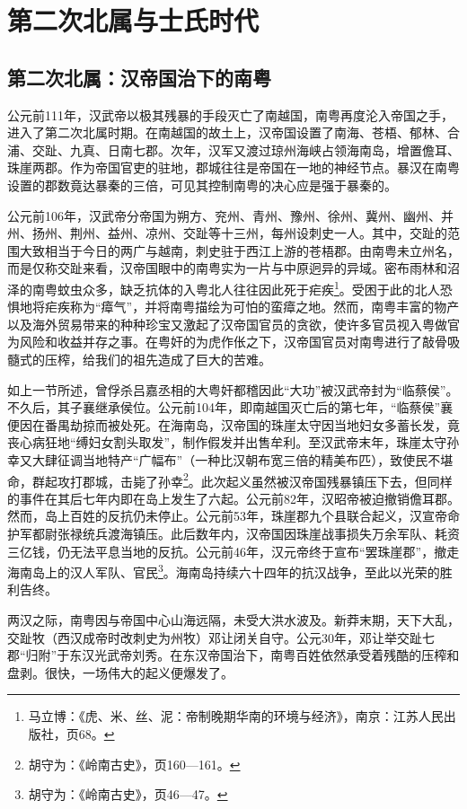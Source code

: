 \chapter{第二次北属与士氏时代}

\section{第二次北属：汉帝国治下的南粤}

\indent 公元前111年，汉武帝以极其残暴的手段灭亡了南越国，南粤再度沦入帝国之手，进入了第二次北属时期。在南越国的故土上，汉帝国设置了南海、苍梧、郁林、合浦、交趾、九真、日南七郡。次年，汉军又渡过琼州海峡占领海南岛，增置儋耳、珠崖两郡。作为帝国官吏的驻地，郡城往往是帝国在一地的神经节点。暴汉在南粤设置的郡数竟达暴秦的三倍，可见其控制南粤的决心应是强于暴秦的。

公元前106年，汉武帝分帝国为朔方、兖州、青州、豫州、徐州、冀州、幽州、并州、扬州、荆州、益州、凉州、交趾等十三州，每州设刺史一人。其中，交趾的范围大致相当于今日的两广与越南，刺史驻于西江上游的苍梧郡。由南粤未立州名，而是仅称交趾来看，汉帝国眼中的南粤实为一片与中原迥异的异域。密布雨林和沼泽的南粤蚊虫众多，缺乏抗体的入粤北人往往因此死于疟疾\footnote{马立博：《虎、米、丝、泥：帝制晚期华南的环境与经济》，南京：江苏人民出版社，页68。}。受困于此的北人恐惧地将疟疾称为“瘴气”，并将南粤描绘为可怕的蛮瘴之地。然而，南粤丰富的物产以及海外贸易带来的种种珍宝又激起了汉帝国官员的贪欲，使许多官员视入粤做官为风险和收益并存之事。在粤奸的为虎作伥之下，汉帝国官员对南粤进行了敲骨吸髓式的压榨，给我们的祖先造成了巨大的苦难。

如上一节所述，曾俘杀吕嘉丞相的大粤奸都稽因此“大功”被汉武帝封为“临蔡侯”。不久后，其子襄继承侯位。公元前104年，即南越国灭亡后的第七年，“临蔡侯”襄便因在番禺劫掠而被处死。在海南岛，汉帝国的珠崖太守因当地妇女多蓄长发，竟丧心病狂地“缚妇女割头取发”，制作假发并出售牟利。至汉武帝末年，珠崖太守孙幸又大肆征调当地特产“广幅布”（一种比汉朝布宽三倍的精美布匹），致使民不堪命，群起攻打郡城，击毙了孙幸\footnote{胡守为：《岭南古史》，页160—161。}。此次起义虽然被汉帝国残暴镇压下去，但同样的事件在其后七年内即在岛上发生了六起。公元前82年，汉昭帝被迫撤销儋耳郡。然而，岛上百姓的反抗仍未停止。公元前53年，珠崖郡九个县联合起义，汉宣帝命护军都尉张禄统兵渡海镇压。此后数年内，汉帝国因珠崖战事损失万余军队、耗资三亿钱，仍无法平息当地的反抗。公元前46年，汉元帝终于宣布“罢珠崖郡”，撤走海南岛上的汉人军队、官民\footnote{胡守为：《岭南古史》，页46—47。}。海南岛持续六十四年的抗汉战争，至此以光荣的胜利告终。

两汉之际，南粤因与帝国中心山海远隔，未受大洪水波及。新莽末期，天下大乱，交趾牧（西汉成帝时改刺史为州牧）邓让闭关自守。公元30年，邓让举交趾七郡“归附”于东汉光武帝刘秀。在东汉帝国治下，南粤百姓依然承受着残酷的压榨和盘剥。很快，一场伟大的起义便爆发了。

